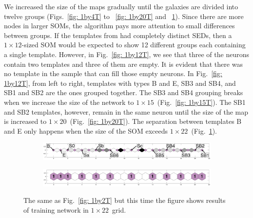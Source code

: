             We increased the size of the maps gradually until the galaxies are divided into twelve groups (Figs.~\ref{fig: 1by4T} to ~\ref{fig: 1by20T} and ~\ref{fig: 1by22T}).
            Since there are more nodes in larger SOMs, the  algorithm 
            pays more attention to small differences between groups.
            If the templates from  had completely distinct SEDs, then a $1\times12$-sized SOM would be expected to show 12 different groups each containing a single template.
            However, in Fig.~\ref{fig: 1by12T}, we see that three of the neurons contain two templates and three of them are empty.
            It is evident that there was no template in the  sample that can fill those empty neurons.
            In Fig.~\ref{fig: 1by12T}, from left to right, templates with types B and E, SB3 and SB4, and SB1 and SB2 are the ones grouped together. 
            The SB3 and SB4 grouping breaks when we increase the size of the network to $1\times15$~(Fig.~\ref{fig: 1by15T}).
            The SB1 and SB2 templates, however, remain in the same neuron until the size of the map is increased to $1\times20$~(Fig.~\ref{fig: 1by20T}).
            The separation between templates B and E only happens when the size of the SOM exceeds $1\times22$~(Fig.~\ref{fig: 1by22T}).
        \begin{figure}
            \begin{subfigure}[b]{\textwidth}
                \centering
                \includegraphics[width=\textwidth]{images0.01/1d/dist_1_by_22.png}
            \end{subfigure}
            \hfill
            \begin{subfigure}[b]{\textwidth}
                \includegraphics[width=\textwidth]{images0.01/1d/hit_t_1_by_22.png}
            \end{subfigure}
            \caption{The same as Fig.~\ref{fig: 1by2T} but this time the figure shows results of training network in $1\times22$~grid.}
            \label{fig: 1by22T}
        \end{figure} %
    
